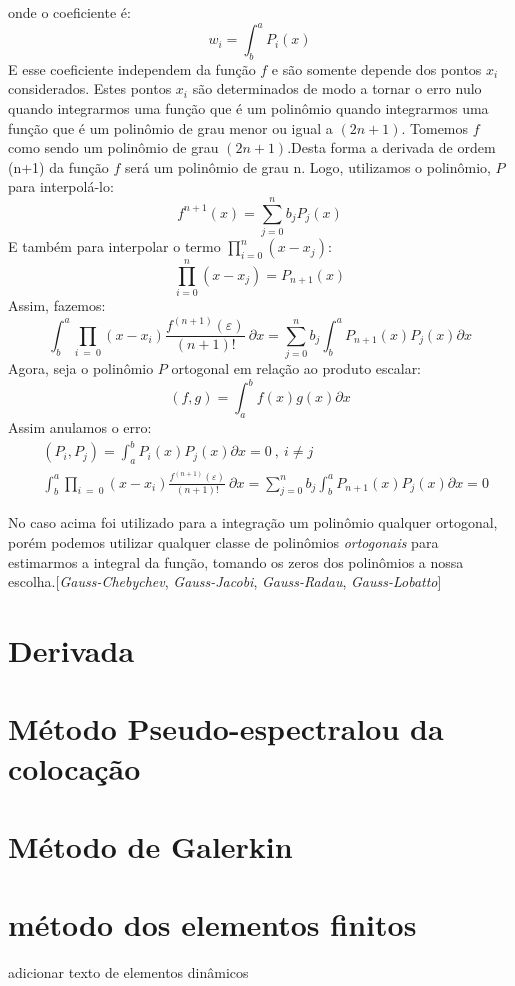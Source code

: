 onde o coeficiente é:
\begin{equation}
 w_i =  \int^{a}_b  P_i(x) 
\end{equation}
 E esse coeficiente independem da função $f$ e são somente depende dos pontos $x_i$ considerados. Estes pontos $x_i$ são determinados de modo a tornar o erro nulo quando integrarmos uma função que é um polinômio quando integrarmos uma função que é um polinômio de grau menor ou igual a $(2n +1)$.
 Tomemos $f$ como sendo um polinômio de grau $(2n+1)$.Desta forma a derivada de ordem (n+1) da função $f$ será um polinômio de grau n. Logo, utilizamos o polinômio, $P$ para interpolá-lo:
 \begin{equation}
 f^{n+1}(x) = \sum^{n}_{j = 0} b_j P_j(x)
 \end{equation}
 E também para interpolar o termo $\prod^{n}_{i = 0} (x - x_j)$:
\begin{equation}
 \prod^{n}_{i = 0} (x - x_j) =  P_{n+1}(x)
\end{equation}  
Assim, fazemos:
\begin{equation}
\int^{a}_b \prod_{i\ =\ 0} (x - x_i)\frac{f^{(n+1)}(\varepsilon)}{(n+1)!}\ \partial x = \sum^{n}_{j = 0} b_j \int^{a}_b   P_{n+1}(x) P_j(x) \partial x
\end{equation}
 Agora, seja o polinômio $P$ ortogonal  em relação ao produto escalar:
\begin{equation}
 (f,g) = \int^b_a f(x)g(x) \partial x
\end{equation}
 Assim anulamos o erro:
\begin{align}
&(P_i,P_j) = \int^b_a P_i(x) P_j(x) \partial x = 0\ ,\ i \neq j\\
&\int^{a}_b \prod_{i\ =\ 0} (x - x_i)\frac{f^{(n+1)}(\varepsilon)}{(n+1)!}\ \partial x = \sum^{n}_{j = 0} b_j \int^{a}_b   P_{n+1}(x) P_j(x) \partial x = 0
\end{align}

 No caso acima foi utilizado para a integração um polinômio qualquer ortogonal, porém podemos utilizar qualquer classe de polinômios \emph{ortogonais} para estimarmos a integral da função, tomando os zeros dos polinômios a nossa escolha.[\emph{Gauss-Chebychev}, \emph{Gauss-Jacobi}, \emph{Gauss-Radau}, \emph{Gauss-Lobatto}]
\section{Derivada}


\section{Método Pseudo-espectralou da colocação}

\section{Método de Galerkin}

\section{método dos elementos finitos}
adicionar texto de elementos dinâmicos
